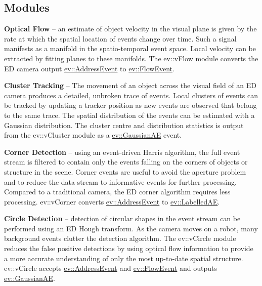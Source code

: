 \subsection*{Modules}


\begin{DoxyItemize}
\item {\bfseries Optical Flow} -- an estimate of object velocity in the visual plane is given by the rate at which the spatial location of events change over time. Such a signal manifests as a manifold in the spatio-\/temporal event space. Local velocity can be extracted by fitting planes to these manifolds. The {\ttfamily ev\+::v\+Flow} module converts the ED camera output {\ttfamily \hyperlink{classev_1_1AddressEvent}{ev\+::\+Address\+Event}} to {\ttfamily \hyperlink{classev_1_1FlowEvent}{ev\+::\+Flow\+Event}}.
\item {\bfseries Cluster Tracking} -- The movement of an object across the visual field of an ED camera produces a detailed, unbroken trace of events. Local clusters of events can be tracked by updating a tracker position as new events are observed that belong to the same trace. The spatial distribution of the events can be estimated with a Gaussian distribution. The cluster centre and distribution statistics is output from the {\ttfamily ev\+::v\+Cluster} module as a {\ttfamily \hyperlink{classev_1_1GaussianAE}{ev\+::\+Gaussian\+AE}} event.
\item {\bfseries Corner Detection} -- using an event-\/driven Harris algorithm, the full event stream is filtered to contain only the events falling on the corners of objects or structure in the scene. Corner events are useful to avoid the aperture problem and to reduce the data stream to informative events for further processing. Compared to a traditional camera, the ED corner algorithm requires less processing. {\ttfamily ev\+::v\+Corner} converts {\ttfamily \hyperlink{classev_1_1AddressEvent}{ev\+::\+Address\+Event}} to {\ttfamily \hyperlink{classev_1_1LabelledAE}{ev\+::\+Labelled\+AE}}.
\item {\bfseries Circle Detection} -- detection of circular shapes in the event stream can be performed using an ED Hough transform. As the camera moves on a robot, many background events clutter the detection algorithm. The {\ttfamily ev\+::v\+Circle} module reduces the false positive detections by using optical flow information to provide a more accurate understanding of only the most up-\/to-\/date spatial structure. {\ttfamily ev\+::v\+Circle} accepts {\ttfamily \hyperlink{classev_1_1AddressEvent}{ev\+::\+Address\+Event}} and {\ttfamily \hyperlink{classev_1_1FlowEvent}{ev\+::\+Flow\+Event}} and outputs {\ttfamily \hyperlink{classev_1_1GaussianAE}{ev\+::\+Gaussian\+AE}}.

\end{DoxyItemize}
